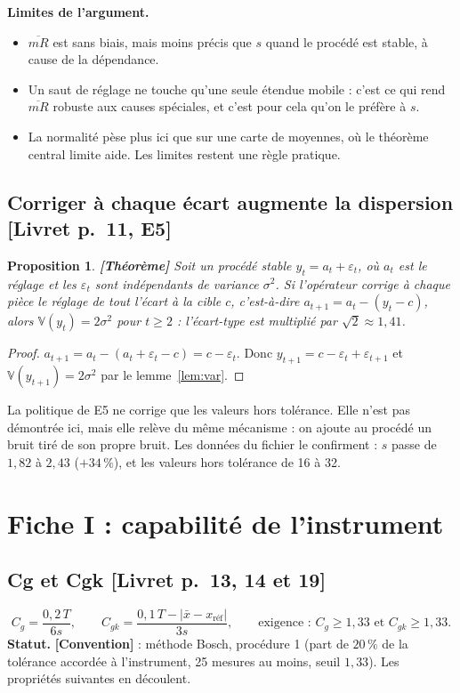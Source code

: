 \documentclass[11pt,a4paper]{article}
\theoremstyle{tq}
\newtheorem{prop}{Proposition}
\theoremstyle{remark}
\newcommand{\thm}{\textcolor{vertTQ}{\textbf{[Théorème]}}}
\newcommand{\conv}{\textcolor{orangeTQ}{\textbf{[Convention]}}}
\newcommand{\liv}[1]{\textcolor{uimmblue}{\small[Livret p.~#1]}}
\newcommand{\V}{\mathbb{V}}
\newcommand{\mRb}{\overline{mR}}
\begin{document}
\textbf{Limites de l'argument.}
\begin{itemize}[nosep,leftmargin=1.2em]
\item $\mRb$ est sans biais, mais moins précis que $s$ quand le procédé est stable, à cause de la dépendance.
\item Un saut de réglage ne touche qu'une seule étendue mobile : c'est ce qui rend $\mRb$ robuste aux causes spéciales, et c'est pour cela qu'on le préfère à $s$.
\item La normalité pèse plus ici que sur une carte de moyennes, où le théorème central limite aide. Les limites restent une règle pratique.
\end{itemize}

\subsection{Corriger à chaque écart augmente la dispersion \liv{11, E5}}
\begin{prop}\thm{}
Soit un procédé stable $y_t=a_t+\varepsilon_t$, où $a_t$ est le réglage et les $\varepsilon_t$ sont indépendants de variance $\sigma^2$. Si l'opérateur corrige \emph{à chaque pièce} le réglage de tout l'écart à la cible $c$, c'est-à-dire $a_{t+1}=a_t-(y_t-c)$, alors $\V(y_t)=2\sigma^2$ pour $t\ge2$ : l'écart-type est multiplié par $\sqrt2\approx1{,}41$.
\end{prop}
\begin{proof}
$a_{t+1}=a_t-(a_t+\varepsilon_t-c)=c-\varepsilon_t$. Donc $y_{t+1}=c-\varepsilon_t+\varepsilon_{t+1}$ et $\V(y_{t+1})=2\sigma^2$ par le lemme~\ref{lem:var}.
\end{proof}
La politique de E5 ne corrige que les valeurs hors tolérance. Elle n'est pas démontrée ici, mais elle relève du même mécanisme : on ajoute au procédé un bruit tiré de son propre bruit. Les données du fichier le confirment : $s$ passe de $1{,}82$ à $2{,}43$ ($+34\,\%$), et les valeurs hors tolérance de 16 à 32.

\section{Fiche I : capabilité de l'instrument}\label{sec:I}

\subsection{Cg et Cgk \liv{13, 14 et 19}}
\[
C_g=\frac{0{,}2\,T}{6s},\qquad C_{gk}=\frac{0{,}1\,T-|\bar x-x_{\text{réf}}|}{3s},\qquad\text{exigence : }C_g\ge1{,}33\text{ et }C_{gk}\ge1{,}33 .
\]
\textbf{Statut.} \conv{} : méthode Bosch, procédure 1 (part de $20\,\%$ de la tolérance accordée à l'instrument, 25 mesures au moins, seuil $1{,}33$). Les propriétés suivantes en découlent.
\end{document}
